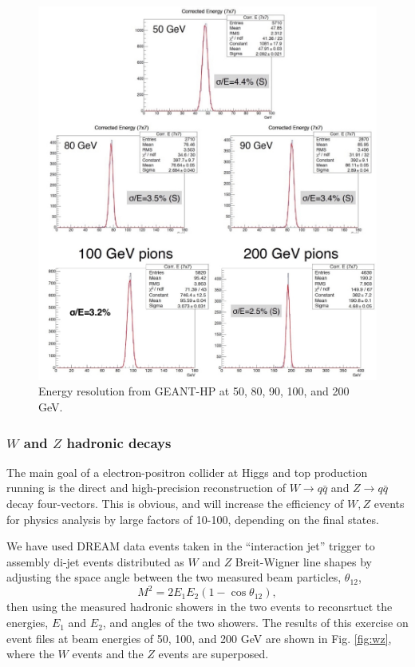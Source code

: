 \begin{figure}[h!]
 \centering
 \includegraphics[scale=0.6]{eres.jpg}
  \caption{Energy resolution from GEANT-HP at 50, 80, 90, 100, and 200 GeV.}
  \label{fig:eres}
\end{figure}


\subsubsection{$W$ and $Z$ hadronic decays}

The main goal of a electron-positron collider at  Higgs and top production running is the direct and high-precision reconstruction of  $W \rightarrow q\bar{q}$ and  $Z \rightarrow q\bar{q}$ decay four-vectors.   This is obvious, and will increase the efficiency of $W,Z$ events for physics analysis by large factors of 10-100, depending on the final states.

We have used DREAM data events taken in the ``interaction jet'' trigger to assembly di-jet events distributed as $W$ and $Z$ Breit-Wigner line shapes by adjusting the space angle between the two measured beam particles, $\theta_{12}$, 
\begin{displaymath}
   M^2 = 2 E_1 E_2 ( 1 - \cos \theta_{12}),
\end{displaymath}
then using the measured hadronic showers in the two events to reconsrtuct the energies, $E_1$ and $E_2$, and angles of the two showers.  The results of this exercise on event files at beam energies of 50, 100, and 200 GeV are shown in 
Fig. \ref{fig:wz}, where the $W$ events and the $Z$ events are superposed.

